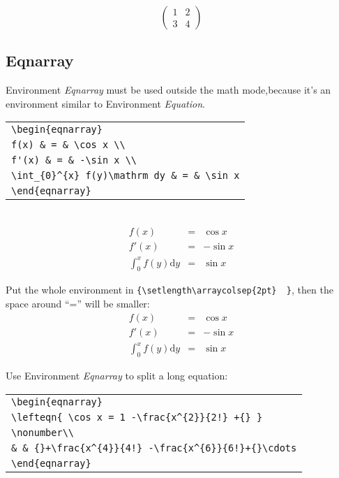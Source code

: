 \documentclass[a4paper]{report}
\begin{document}
\begin{displaymath}
\left(\begin{array}{c|c}
1 & 2 \\
\hline 3 & 4
\end{array}\right)
\end{displaymath}

\subsection{Eqnarray}

Environment \emph{Eqnarray} must be used outside the math
mode,because it's an environment similar to Environment
\emph{Equation}.\\

\begin{tabular}{|l|}
\hline
\verb|\begin{eqnarray}|\\
\verb|f(x) & = & \cos x \\|\\
\verb|f'(x) & = & -\sin x \\|\\
\verb|\int_{0}^{x} f(y)\mathrm dy & = & \sin x|\\
\verb|\end{eqnarray}|\\
\hline
\end{tabular}\\


\begin{eqnarray}
f(x) & = & \cos x \\
f'(x) & = & -\sin x \\
\int_{0}^{x} f(y)\mathrm dy & = & \sin x
\end{eqnarray}

Put the whole environment in \verb|{\setlength\arraycolsep{2pt}  }|,
then the space around ``='' will be smaller:\\

{\setlength\arraycolsep{2pt}
\begin{eqnarray}
f(x) & = & \cos x \\
f'(x) & = & -\sin x \\
\int_{0}^{x} f(y)\mathrm dy & = & \sin x
\end{eqnarray}
}

Use Environment \emph{Eqnarray} to split a long equation:\\

\begin{tabular}{|l|}
\hline
\verb|\begin{eqnarray}|\\
\verb|\lefteqn{ \cos x = 1 -\frac{x^{2}}{2!} +{} }|\\
\verb|\nonumber\\|\\
\verb|& & {}+\frac{x^{4}}{4!} -\frac{x^{6}}{6!}+{}\cdots|\\
\verb|\end{eqnarray}|\\
\hline
\end{tabular}\\
\end{document}
